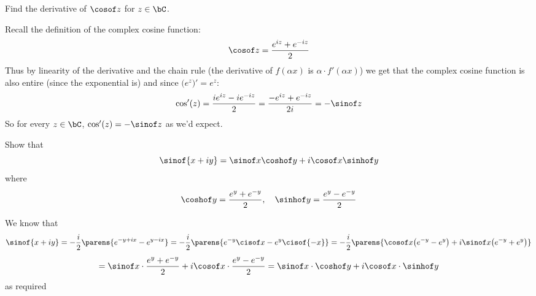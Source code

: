 \documentclass[10pt]{article}
\def\bexerc{\begin{exercise*}}
\def\eexerc{\end{exercise*}}
\def\bblank{\begin{blankpp}}
\def\eblank{\end{blankpp}}
\begin{document}
\bexerc

    Find the derivative of $\cosof z$ for $z\in\bC$.

\eexerc

\bblank

    Recall the definition of the complex cosine function:
    \[ \cosof z = \frac{e^{iz} + e^{-iz}}2 \]
    Thus by linearity of the derivative and the chain rule (the derivative of $f(\alpha x)$ is $\alpha\cdot f'(\alpha x)$) we get that the complex cosine function is also entire (since the exponential is)
    and since $\bigl(e^z\bigr)'=e^z$:
    \[ \cos'(z) = \frac{ie^{iz} - ie^{-iz}}2 = \frac{-e^{iz} + e^{-iz}}{2i} = -\sinof z \]
    So for every $z\in\bC$, $\cos'(z)=-\sinof z$ as we'd expect.

\eblank

\bexerc

    Show that
    \[ \sinof{x+iy} = \sinof x\coshof y+i\cosof x\sinhof y \]
    where
    \[ \coshof y = \frac{e^y+e^{-y}}2,\quad \sinhof y=\frac{e^y-e^{-y}}2 \]

\eexerc

\bblank

    We know that
    \[ \sinof{x+iy} = -\frac i2\parens{e^{-y+ix} - e^{y-ix}} = -\frac i2\parens{e^{-y}\cisof x - e^y\cisof{-x}} = -\frac i2\parens{\cosof x\bigl(e^{-y} - e^y\bigr) + i\sinof x\bigl(e^{-y} + e^y\bigr)} \]
    \[ = \sinof x\cdot\frac{e^y + e^{-y}}2 + i\cosof x\cdot\frac{e^y - e^{-y}}2 = \sinof x\cdot\coshof y + i\cosof x\cdot\sinhof y \]
    as required

\eblank
\end{document}
